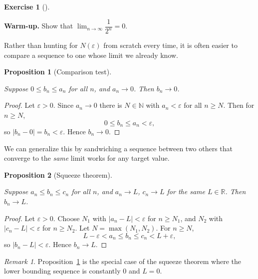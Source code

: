 \documentclass[
  letterpaper,
  DIV=11,
  numbers=noendperiod]{scrreprt}
\theoremstyle{plain}
\theoremstyle{plain}
\newtheorem{proposition}{Proposition}[chapter]
\theoremstyle{definition}
\theoremstyle{definition}
\newtheorem{exercise}{Exercise}[chapter]
\theoremstyle{definition}
\theoremstyle{plain}
\theoremstyle{plain}
\theoremstyle{remark}
\newtheorem{refremark}{Remark}[chapter]
\begin{document}
\begin{exercise}[]\protect\hypertarget{exr-warmup-half-n}{}\label{exr-warmup-half-n}

\textbf{Warm-up.} Show that \(\lim_{n\to\infty} \dfrac{1}{2^n} = 0\).

\end{exercise}

Rather than hunting for \(N(\varepsilon)\) from scratch every time, it
is often easier to compare a sequence to one whose limit we already
know.

\begin{proposition}[Comparison
test]\protect\hypertarget{prp-comparison}{}\label{prp-comparison}

Suppose \(0 \le b_n \le a_n\) for all \(n\), and \(a_n \to 0\). Then
\(b_n \to 0\).

\end{proposition}

\begin{proof}
Let \(\varepsilon>0\). Since \(a_n\to0\) there is \(N\in\mathbb{N}\)
with \(a_n < \varepsilon\) for all \(n\ge N\). Then for \(n\ge N\), \[
0 \le b_n \le a_n < \varepsilon,
\] so \(\lvert b_n - 0 \rvert = b_n < \varepsilon\). Hence
\(b_n \to 0\).
\end{proof}

We can generalize this by sandwiching a sequence between two others that
converge to the \emph{same} limit works for any target value.

\begin{proposition}[Squeeze
theorem]\protect\hypertarget{prp-squeeze}{}\label{prp-squeeze}

Suppose \(a_n \le b_n \le c_n\) for all \(n\), and \(a_n \to L\),
\(c_n \to L\) for the same \(L\in\mathbb{R}\). Then \(b_n \to L\).

\end{proposition}

\begin{proof}
Let \(\varepsilon>0\). Choose \(N_1\) with
\(\lvert a_n-L \rvert<\varepsilon\) for \(n\ge N_1\), and \(N_2\) with
\(\lvert c_n-L \rvert<\varepsilon\) for \(n\ge N_2\). Let
\(N=\max(N_1,N_2)\). For \(n\ge N\), \[
L-\varepsilon< a_n \le b_n \le c_n < L+\varepsilon,
\] so \(\lvert b_n-L \rvert<\varepsilon\). Hence \(b_n\to L\).
\end{proof}

\begin{refremark}
Proposition~\ref{prp-comparison} is the special case of the squeeze
theorem where the lower bounding sequence is constantly \(0\) and
\(L=0\).

\label{rem-squeeze-comparison}

\end{refremark}
\end{document}
